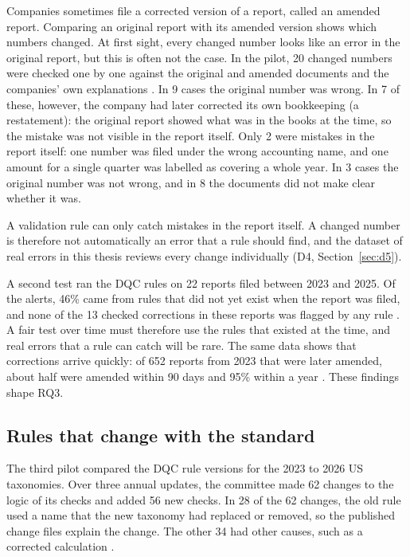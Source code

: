 \documentclass[11pt,a4paper]{article}
\let\oldsubsection\subsection
\renewcommand{\subsection}{\FloatBarrier\oldsubsection}
\begin{document}
Companies sometimes file a corrected version of a report, called an amended report. Comparing an original report with its amended version shows which numbers changed. At first sight, every changed number looks like an error in the original report, but this is often not the case. In the pilot, 20 changed numbers were checked one by one against the original and amended documents and the companies' own explanations \cite{pilotreport,repo}. In 9 cases the original number was wrong. In 7 of these, however, the company had later corrected its own bookkeeping (a restatement): the original report showed what was in the books at the time, so the mistake was not visible in the report itself. Only 2 were mistakes in the report itself: one number was filed under the wrong accounting name, and one amount for a single quarter was labelled as covering a whole year. In 3 cases the original number was not wrong, and in 8 the documents did not make clear whether it was.

A validation rule can only catch mistakes in the report itself. A changed number is therefore not automatically an error that a rule should find, and the dataset of real errors in this thesis reviews every change individually (D4, Section~\ref{sec:d5}).

A second test ran the DQC rules on 22 reports filed between 2023 and 2025. Of the alerts, 46\% came from rules that did not yet exist when the report was filed, and none of the 13 checked corrections in these reports was flagged by any rule \cite{feasibility}. A fair test over time must therefore use the rules that existed at the time, and real errors that a rule can catch will be rare. The same data shows that corrections arrive quickly: of 652 reports from 2023 that were later amended, about half were amended within 90 days and 95\% within a year \cite{repo}. These findings shape RQ3.

\subsection{Rules that change with the standard}
\label{sec:pilotb}

The third pilot compared the DQC rule versions for the 2023 to 2026 US taxonomies. Over three annual updates, the committee made 62 changes to the logic of its checks and added 56 new checks. In 28 of the 62 changes, the old rule used a name that the new taxonomy had replaced or removed, so the published change files explain the change. The other 34 had other causes, such as a corrected calculation \cite{pilotb}.
\end{document}
